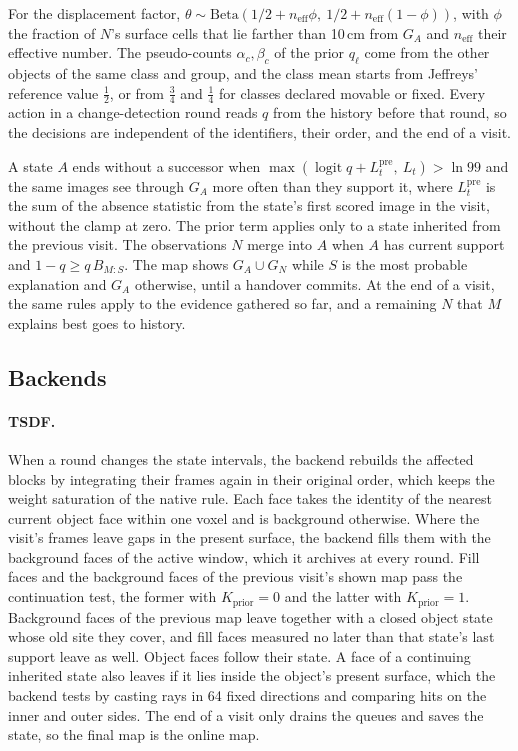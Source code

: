 For the displacement factor, $\theta \sim \mathrm{Beta}(1/2 + n_{\mathrm{eff}}\phi,\ 1/2 + n_{\mathrm{eff}}(1-\phi))$, with
$\phi$ the fraction of $N$'s surface cells that lie farther than 10\,cm from $G_A$ and $n_{\mathrm{eff}}$ their effective
number. The
pseudo-counts $\alpha_c, \beta_c$ of the prior $q_\ell$ come from the other objects of the same class and group, and the class mean starts
from Jeffreys' reference value $\frac{1}{2}$, or from $\frac{3}{4}$ and $\frac{1}{4}$ for classes declared movable or
fixed. Every action in a change-detection round reads $q$ from the history before that round, so the decisions are
independent of the identifiers, their order, and the end of a visit.

A state $A$ ends without a successor when $\max(\operatorname{logit} q + L^{\mathrm{pre}}_t,\ L_t) > \ln 99$ and the
same images see through $G_A$ more often than they support it, where $L^{\mathrm{pre}}_t$ is the sum of the absence
statistic from the state's first scored image in the visit, without the clamp at zero. The prior term applies only to a state inherited from the
previous visit. The observations $N$ merge into $A$ when $A$ has current support and
$1 - q \ge q\,B_{M:S}$. The map shows $G_A \cup G_N$ while $S$ is the most probable explanation and $G_A$ otherwise,
until a handover commits. At the end of a visit, the same rules apply to the evidence gathered so far, and a remaining
$N$ that $M$ explains best goes to history.

\subsection{Backends}
\label{sec:supp_backends}

\paragraph{TSDF.}
When a round changes the state intervals, the backend rebuilds the affected blocks by integrating their frames again in
their original order, which keeps the weight saturation of the native rule. Each face takes the identity of the nearest
current object face within one voxel and is background otherwise. Where the visit's frames leave gaps in the present
surface, the backend fills them with the background faces of the active window, which it archives at every round. Fill
faces and the background faces of the previous visit's shown map pass the continuation test, the former with
$K_{\mathrm{prior}} = 0$ and the latter with $K_{\mathrm{prior}} = 1$. Background faces of the previous map leave
together with a closed object state whose old site they cover, and fill faces measured no later than that state's last
support leave as well. Object faces follow their state. A face of a continuing inherited state also leaves if it lies
inside the object's present surface, which the backend tests by casting rays in 64 fixed directions and comparing hits
on the inner and outer sides. The end of a visit only drains the queues and saves the state, so the final map is the
online map.

